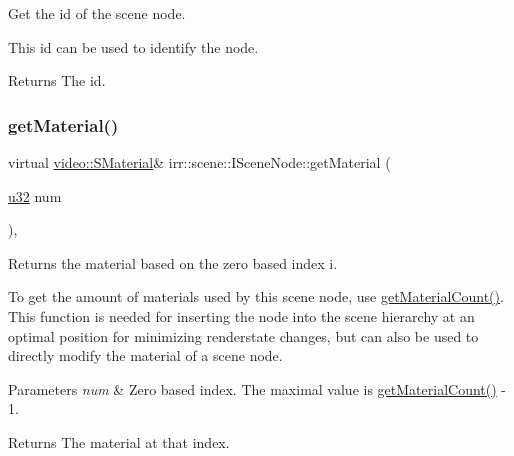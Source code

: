 Get the id of the scene node. 

This id can be used to identify the node. \begin{DoxyReturn}{Returns}
The id. 
\end{DoxyReturn}
\mbox{\label{classirr_1_1scene_1_1ISceneNode_a1f44d8cf753b2e4c17c90d4fc2ed05b2}} 
\subsubsection{\texorpdfstring{get\+Material()}{getMaterial()}\hspace{0.1cm}{\footnotesize\ttfamily [1/2]}}
{\footnotesize\ttfamily virtual \hyperlink{classirr_1_1video_1_1SMaterial}{video\+::\+S\+Material}\& irr\+::scene\+::\+I\+Scene\+Node\+::get\+Material (\begin{DoxyParamCaption}\item[{\hyperlink{namespaceirr_a0416a53257075833e7002efd0a18e804}{u32}}]{num }\end{DoxyParamCaption})\hspace{0.3cm}{\ttfamily [inline]}, {\ttfamily [virtual]}}



Returns the material based on the zero based index i. 

To get the amount of materials used by this scene node, use \hyperlink{classirr_1_1scene_1_1ISceneNode_a8e75e9baede63e31e6aa6e42e6c8ddfe}{get\+Material\+Count()}. This function is needed for inserting the node into the scene hierarchy at an optimal position for minimizing renderstate changes, but can also be used to directly modify the material of a scene node. 
\begin{DoxyParams}{Parameters}
{\em num} & Zero based index. The maximal value is \hyperlink{classirr_1_1scene_1_1ISceneNode_a8e75e9baede63e31e6aa6e42e6c8ddfe}{get\+Material\+Count()} -\/ 1. \\
\hline
\end{DoxyParams}
\begin{DoxyReturn}{Returns}
The material at that index. 
\end{DoxyReturn}
\mbox{\label{classirr_1_1scene_1_1ISceneNode_a1f44d8cf753b2e4c17c90d4fc2ed05b2}} 
